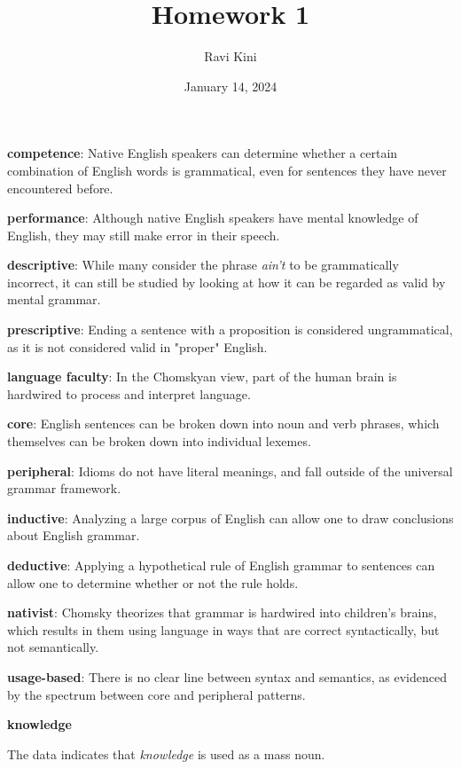 \documentclass{article}
\title{Homework 1}
\author{Ravi Kini}
\date{January 14, 2024}
\begin{document}
\maketitle

\textbf{competence}: Native English speakers can determine whether a certain combination of English words is grammatical, even for sentences they have never encountered before.

\textbf{performance}: Although native English speakers have mental knowledge of English, they may still make error in their speech.

\textbf{descriptive}: While many consider the phrase \textit{ain't} to be grammatically incorrect, it can still be studied by looking at how it can be regarded as valid by mental grammar.

\textbf{prescriptive}: Ending a sentence with a proposition is considered ungrammatical, as it is not considered valid in "proper" English.

\textbf{language faculty}: In the Chomskyan view, part of the human brain is hardwired to process and interpret language.

\textbf{core}: English sentences can be broken down into noun and verb phrases, which themselves can be broken down into individual lexemes.

\textbf{peripheral}: Idioms do not have literal meanings, and fall outside of the universal grammar framework.

\textbf{inductive}: Analyzing a large corpus of English can allow one to draw conclusions about English grammar.

\textbf{deductive}: Applying a hypothetical rule of English grammar to sentences can allow one to determine whether or not the rule holds.

\textbf{nativist}: Chomsky theorizes that grammar is hardwired into children's brains, which results in them using language in ways that are correct syntactically, but not semantically.

\textbf{usage-based}: There is no clear line between syntax and semantics, as evidenced by the spectrum between core and peripheral patterns.
\clearpage

\textbf{knowledge}
\begin{exe}
\end{exe}
The data indicates that \textit{knowledge} is used as a mass noun.
\end{document}
